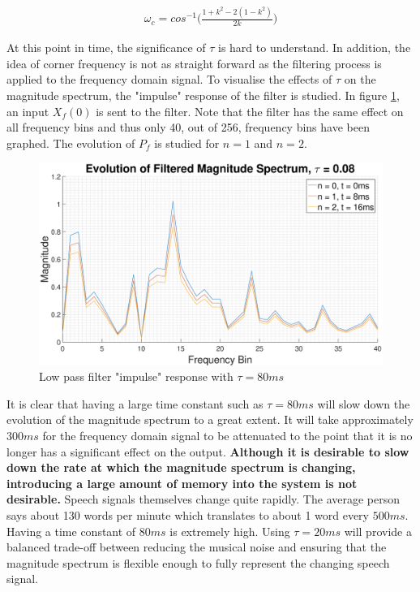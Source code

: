 \documentclass[a4paper,pra,twocolumn,10pt,aps,longbibliography,nobalancelastpage]{revtex4-1}
\begin{document}
\begin{align}
    \omega_{c} = cos^{-1}\Big(\frac{1+k^{2}-2(1-k^{2})}{2k}\Big)\label{eq:lp_cf}
\end{align}

At this point in time, the significance of $\tau$ is hard to understand. In addition, the idea of corner frequency is not as straight forward as the filtering process is applied to the frequency domain signal. To visualise the effects of $\tau$ on the magnitude spectrum, the "impulse" response of the filter is studied. In figure \ref{fig:lp_impulse_1}, an input $X_{f}(0)$ is sent to the filter. Note that the filter has the same effect on all frequency bins and thus only 40, out of 256, frequency bins have been graphed. The evolution of $P_{f}$ is studied for $n=1$ and $n=2$.

\begin{figure}[H]
	\centering
	\includegraphics[width=\columnwidth]{X_filt_tau_008}
  	\caption{Low pass filter "impulse" response with $\tau=80ms$}
	\label{fig:lp_impulse_1}
\end{figure}


It is clear that having a large time constant such as $\tau=80ms$ will slow down the evolution of the magnitude spectrum to a great extent. It will take approximately $300ms$ for the frequency domain signal to be attenuated to the point that it is no longer has a significant effect on the output. \textbf{Although it is desirable to slow down the rate at which the magnitude spectrum is changing, introducing a large amount of memory into the system is not desirable.} Speech signals themselves change quite rapidly. The average person says about 130 words per minute which translates to about 1 word every $500ms$. Having a time constant of $80ms$ is extremely high. Using $\tau=20ms$ will provide a balanced trade-off between reducing the musical noise and ensuring that the magnitude spectrum is flexible enough to fully represent the changing speech signal. 
\end{document}
